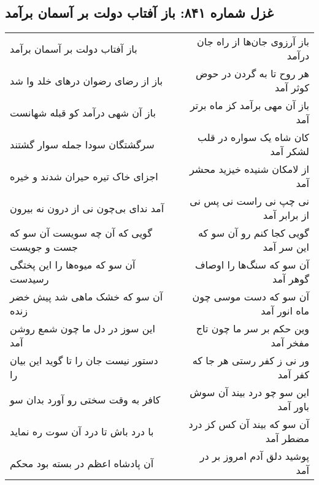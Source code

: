 \begin{center}
\section*{غزل شماره ۸۴۱: باز آفتاب دولت بر آسمان برآمد}
\label{sec:0841}
\begin{longtable}{l p{0.5cm} r}
باز آفتاب دولت بر آسمان برآمد
&&
باز آرزوی جان‌ها از راه جان درآمد
\\
باز از رضای رضوان درهای خلد وا شد
&&
هر روح تا به گردن در حوض کوثر آمد
\\
باز آن شهی درآمد کو قبله شهانست
&&
باز آن مهی برآمد کز ماه برتر آمد
\\
سرگشتگان سودا جمله سوار گشتند
&&
کان شاه یک سواره در قلب لشکر آمد
\\
اجزای خاک تیره حیران شدند و خیره
&&
از لامکان شنیده خیزید محشر آمد
\\
آمد ندای بی‌چون نی از درون نه بیرون
&&
نی چپ نی راست نی پس نی از برابر آمد
\\
گویی که آن چه سویست آن سو که جست و جویست
&&
گویی کجا کنم رو آن سو که این سر آمد
\\
آن سو که میوه‌ها را این پختگی رسیدست
&&
آن سو که سنگ‌ها را اوصاف گوهر آمد
\\
آن سو که خشک ماهی شد پیش خضر زنده
&&
آن سو که دست موسی چون ماه انور آمد
\\
این سوز در دل ما چون شمع روشن آمد
&&
وین حکم بر سر ما چون تاج مفخر آمد
\\
دستور نیست جان را تا گوید این بیان را
&&
ور نی ز کفر رستی هر جا که کفر آمد
\\
کافر به وقت سختی رو آورد بدان سو
&&
این سو چو درد بیند آن سوش باور آمد
\\
با درد باش تا درد آن سوت ره نماید
&&
آن سو که بیند آن کس کز درد مضطر آمد
\\
آن پادشاه اعظم در بسته بود محکم
&&
پوشید دلق آدم امروز بر در آمد
\\
\end{longtable}
\end{center}
